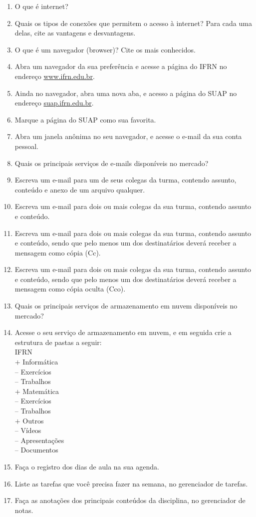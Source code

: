 \documentclass[11pt]{article}
\begin{document}
	\begin{enumerate}
		\item O que é internet?
		\item Quais os tipos de conexões que permitem o acesso à internet? Para cada uma delas, cite as vantagens e desvantagens.
		\item O que é um navegador (browser)? Cite os mais conhecidos.
		\item Abra um navegador da sua preferência e acesse a página do IFRN no endere\c co \url{www.ifrn.edu.br}.
		\item Ainda no navegador, abra uma nova aba, e acesso a página do SUAP no endere\c co \url{suap.ifrn.edu.br}.
		\item Marque a página do SUAP como sua favorita.
		\item Abra um janela anônima no seu navegador, e acesse o e-mail da sua conta pessoal.
		\item Quais os principais servi\c cos de e-mails disponíveis no mercado?
		\item Escreva um e-mail para um de seus colegas da turma, contendo assunto, conteúdo e anexo de um arquivo qualquer.
		\item Escreva um e-mail para dois ou mais colegas da sua turma, contendo assunto e conteúdo.
		\item Escreva um e-mail para dois ou mais colegas da sua turma, contendo assunto e conteúdo, sendo que pelo menos um dos destinatários deverá receber a mensagem como cópia (Cc).
		\item Escreva um e-mail para dois ou mais colegas da sua turma, contendo assunto e conteúdo, sendo que pelo menos um dos destinatários deverá receber a mensagem como cópia oculta (Cco).
		\item Quais os principais servi\c cos de armazenamento em nuvem disponíveis no mercado?
		\item Acesse o seu servi\c co de armazenamento em nuvem, e em seguida crie a estrutura de pastas a seguir:\\
IFRN\\
$+$ Informática\\
-- Exercícios\\
-- Trabalhos\\
$+$ Matemática\\
-- Exercícios\\
-- Trabalhos\\
$+$ Outros\\
-- Vídeos\\
-- Apresentações\\
-- Documentos\\
		\item Fa\c ca o registro dos dias de aula na sua agenda.
		\item Liste as tarefas que você precisa fazer na semana, no gerenciador de tarefas.
		\item Fa\c ca as anota\c cões dos principais conteúdos da disciplina, no gerenciador de notas.
	\end{enumerate}
	
\end{document}
